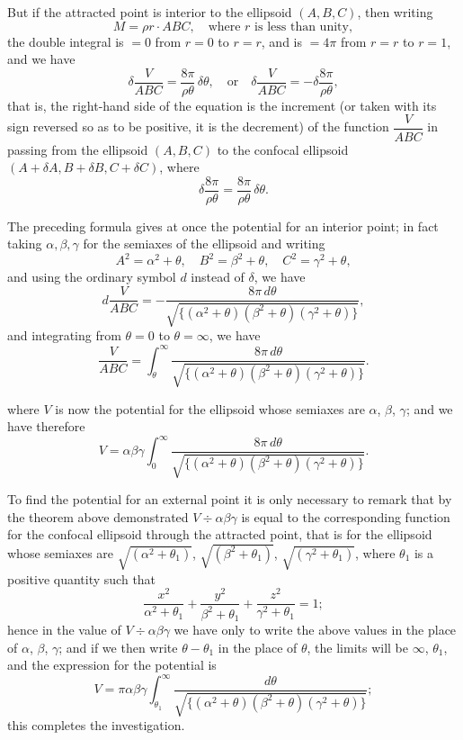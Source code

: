 \documentclass[11pt,a4paper]{book}
\begin{document}
But if the attracted point is interior to the ellipsoid $(A, B, C)$, then writing
\[
M = \rho r \cdot ABC, \quad \text{where } r \text{ is less than unity},
\]
the double integral is $=0$ from $r=0$ to $r=r$, and is $=4\pi$ from $r=r$ to $r=1$,
and we have
\[
\delta\frac{V}{ABC} = \frac{8\pi}{\rho\theta}\,\delta\theta,
\quad\text{or}\quad
\delta\frac{V}{ABC} = -\delta\frac{8\pi}{\rho\theta},
\]
that is, the right-hand side of the equation is the increment (or taken with its sign
reversed so as to be positive, it is the decrement) of the function $\dfrac{V}{ABC}$ in passing
from the ellipsoid $(A, B, C)$ to the confocal ellipsoid $(A+\delta A, B+\delta B, C+\delta C)$,
where
\[
\delta\frac{8\pi}{\rho\theta} = \frac{8\pi}{\rho\theta}\,\delta\theta.
\]

The preceding formula gives at once the potential for an interior point; in fact
taking $\alpha, \beta, \gamma$ for the semiaxes of the ellipsoid and writing
\[
A^2 = \alpha^2 + \theta, \quad B^2 = \beta^2 + \theta, \quad C^2 = \gamma^2 + \theta,
\]
and using the ordinary symbol $d$ instead of $\delta$, we have
\[
d\frac{V}{ABC} = -\frac{8\pi\,d\theta}{\sqrt{\{(
\alpha^2+\theta)(\beta^2+\theta)(\gamma^2+\theta)\}}},
\]
and integrating from $\theta=0$ to $\theta=\infty$, we have
\[
\frac{V}{ABC} = \int_\theta^\infty \frac{8\pi\,d\theta}{\sqrt{\{(
\alpha^2+\theta)(\beta^2+\theta)(\gamma^2+\theta)\}}}.
\]

\noindent
where $V$ is now the potential for the ellipsoid whose semiaxes are $\alpha$, $\beta$, $\gamma$; and we
have therefore
\[
V = \alpha\beta\gamma \int_0^\infty \frac{8\pi\,d\theta}{\sqrt{\{(
\alpha^2+\theta)(\beta^2+\theta)(\gamma^2+\theta)\}}}.
\]

To find the potential for an external point it is only necessary to remark that
by the theorem above demonstrated $V \div \alpha\beta\gamma$ is equal to the corresponding function
for the confocal ellipsoid through the attracted point, that is for the ellipsoid whose
semiaxes are $\sqrt{(\alpha^2+\theta_1)}$, $\sqrt{(\beta^2+\theta_1)}$, $\sqrt{(\gamma^2+\theta_1)}$, where $\theta_1$ is a positive
quantity such that
\[
\frac{x^2}{\alpha^2+\theta_1} + \frac{y^2}{\beta^2+\theta_1} + \frac{z^2}{\gamma^2+\theta_1} = 1;
\]
hence in the value of $V \div \alpha\beta\gamma$ we have only to write the above values in the place
of $\alpha$, $\beta$, $\gamma$; and if we then write $\theta - \theta_1$ in the place of $\theta$, the limits will be
$\infty$, $\theta_1$, and the expression for the potential is
\[
V = \pi\alpha\beta\gamma \int_{\theta_1}^\infty \frac{d\theta}{\sqrt{\{(
\alpha^2+\theta)(\beta^2+\theta)(\gamma^2+\theta)\}}};
\]
this completes the investigation.
\end{document}
